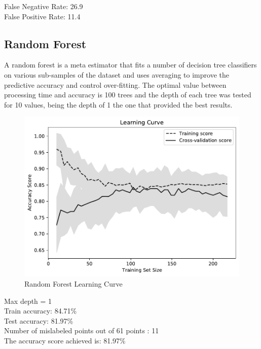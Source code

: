\documentclass[conference]{IEEEtran}
\begin{document}
\noindent
False Negative Rate: 26.9
\\False Positive Rate: 11.4
\newpage

\subsection{Random Forest}

A random forest is a meta estimator that fits a number of decision tree classifiers on various sub-samples of the dataset and uses averaging to improve the predictive accuracy and control over-fitting. The optimal value between processing time and accuracy is 100 trees and the depth of each tree was tested for 10 values, being the depth of 1 the one that provided the best results.

\begin{figure}[H]
    \centerline{\includegraphics[width=0.9\linewidth]{images/RandomForestClassifier_lc.pdf}}
    \caption{Random Forest Learning Curve}
    \label{rf_lc}
\end{figure}

\noindent
Max depth = 1
\\Train accuracy: 84.71\%
\\Test accuracy: 81.97\%
\\[\baselineskip]
Number of mislabeled points out of 61 points : 11
\\The accuracy score achieved is: 81.97\%
\end{document}
